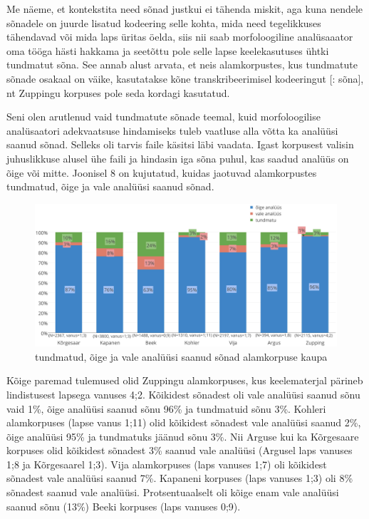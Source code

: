 \documentclass[12pt]{article}
\begin{document}
Me näeme, et kontekstita need sõnad justkui ei tähenda miskit, aga kuna nendele sõnadele on juurde lisatud kodeering selle kohta, mida need tegelikkuses tähendavad või mida laps üritas öelda, siis nii saab morfoloogiline analüsaaator oma tööga hästi hakkama ja seetõttu pole selle lapse keelekasutuses ühtki tundmatut sõna. See annab alust arvata, et neis alamkorpustes, kus tundmatute sõnade osakaal on väike, 
kasutatakse kõne transkribeerimisel kodeeringut [: sõna], nt Zuppingu korpuses pole seda kordagi kasutatud.

Seni olen arutlenud vaid tundmatute sõnade teemal, kuid morfoloogilise analüsaatori adekvaatsuse hindamiseks tuleb vaatluse alla võtta ka analüüsi saanud sõnad. Selleks oli tarvis faile käsitsi läbi vaadata. Igast korpusest valisin juhuslikkuse alusel ühe faili ja hindasin iga sõna puhul, kas saadud analüüs on õige või mitte. Joonisel 8 on kujutatud, kuidas jaotuvad alamkorpustes tundmatud, õige ja vale analüüsi saanud sõnad.
\hfill


\begin{figure}[H]
    \centering
    \includegraphics[width=\textwidth]{kasitsi_crop}
    \caption{tundmatud, õige ja vale analüüsi saanud sõnad alamkorpuse kaupa}
\end{figure}

Kõige paremad tulemused olid Zuppingu alamkorpuses, kus keelematerjal pärineb lindistusest lapsega vanuses 4;2. Kõikidest sõnadest oli vale analüüsi saanud sõnu vaid 1\%, õige analüüsi saanud sõnu 96\% ja tundmatuid sõnu 3\%. Kohleri alamkorpuses (lapse vanus 1;11) olid kõikidest sõnadest vale analüüsi saanud 2\%, õige analüüsi 95\% ja tundmatuks jäänud sõnu 3\%. Nii Arguse kui ka Kõrgesaare korpuses olid kõikidest sõnadest 3\% saanud vale analüüsi (Argusel laps vanuses 1;8 ja Kõrgesaarel 1;3). Vija alamkorpuses (laps vanuses 1;7) oli kõikidest sõnadest vale analüüsi saanud 7\%. Kapaneni korpuses (laps vanuses 1;3) oli 8\% sõnadest saanud vale analüüsi. Protsentuaalselt oli kõige enam vale analüüsi saanud sõnu (13\%) Beeki korpuses (laps vanuses 0;9).
\end{document}
